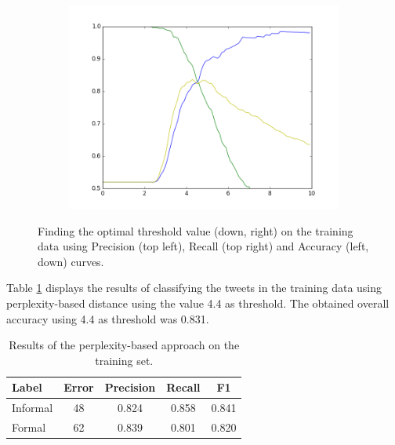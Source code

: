 \documentclass[information,article,submit,moreauthors,pdftex,10pt,a4paper]{Definitions/mdpi}
\begin{document}
\begin{figure}[H]
\begin{subfigure}[b]{0.49\linewidth}
 \end{subfigure}
 \begin{subfigure}[b]{0.49\linewidth}
   \includegraphics[width=\linewidth]{denaperp}
 \end{subfigure}
   \caption{Finding the optimal threshold value (down, right) on the training data using Precision (top left), Recall (top right) and Accuracy (left, down) curves.}\label{fig:threshold}
\end{figure}


Table \ref{tab:perplexitytrain} displays the results of classifying the tweets in the training data using perplexity-based distance using the value 4.4 as threshold. The obtained overall accuracy using 4.4 as threshold was 0.831.

\begin{table}[H]
  \centering
  \begin{tabular}{lcccc} \hline
    Label & Error & Precision & Recall & F1 \\ \hline \hline
    Informal & 48 & 0.824  & 0.858  & 0.841 \\
    Formal & 62 & 0.839 & 0.801 & 0.820 \\ \hline
  \end{tabular}
  \caption{Results of the perplexity-based approach on the training set.}
  \label{tab:perplexitytrain}
\end{table}
\end{document}
